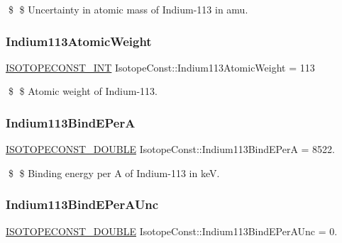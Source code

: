 \$ \$ Uncertainty in atomic mass of Indium-\/113 in amu. \mbox{\label{group___isotope_const-_indium-_in113_ga31d119f6412fbbad698759cf1ffef4f3}} 
\subsubsection{\texorpdfstring{Indium113\+Atomic\+Weight}{Indium113AtomicWeight}}
{\footnotesize\ttfamily \mbox{\hyperlink{group___isotope_const-_macros_ga5f18360b3e99483a35c32d789e62621c}{I\+S\+O\+T\+O\+P\+E\+C\+O\+N\+S\+T\+\_\+\+I\+NT}} Isotope\+Const\+::\+Indium113\+Atomic\+Weight = 113}

\$ \$ Atomic weight of Indium-\/113. \mbox{\label{group___isotope_const-_indium-_in113_ga31926b503ee61e664258d1f69e379380}} 
\subsubsection{\texorpdfstring{Indium113\+Bind\+E\+PerA}{Indium113BindEPerA}}
{\footnotesize\ttfamily \mbox{\hyperlink{group___isotope_const-_macros_ga8f45a7272ce02c0b4c65c44636ed719a}{I\+S\+O\+T\+O\+P\+E\+C\+O\+N\+S\+T\+\_\+\+D\+O\+U\+B\+LE}} Isotope\+Const\+::\+Indium113\+Bind\+E\+PerA = 8522.}

\$ \$ Binding energy per A of Indium-\/113 in keV. \mbox{\label{group___isotope_const-_indium-_in113_ga5e4a01dbe6914efebb52f486ca4f4d6b}} 
\subsubsection{\texorpdfstring{Indium113\+Bind\+E\+Per\+A\+Unc}{Indium113BindEPerAUnc}}
{\footnotesize\ttfamily \mbox{\hyperlink{group___isotope_const-_macros_ga8f45a7272ce02c0b4c65c44636ed719a}{I\+S\+O\+T\+O\+P\+E\+C\+O\+N\+S\+T\+\_\+\+D\+O\+U\+B\+LE}} Isotope\+Const\+::\+Indium113\+Bind\+E\+Per\+A\+Unc = 0.}

